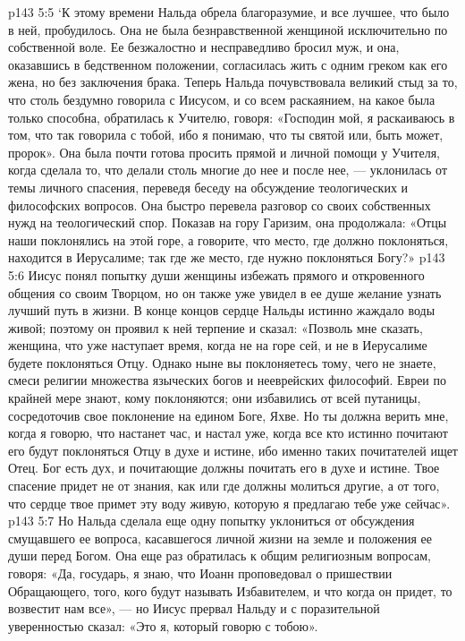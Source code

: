 \vs p143 5:5 `К этому времени Нальда обрела благоразумие, и все лучшее, что было в ней, пробудилось. Она не была безнравственной женщиной исключительно по собственной воле. Ее безжалостно и несправедливо бросил муж, и она, оказавшись в бедственном положении, согласилась жить с одним греком как его жена, но без заключения брака. Теперь Нальда почувствовала великий стыд за то, что столь бездумно говорила с Иисусом, и со всем раскаянием, на какое была только способна, обратилась к Учителю, говоря: «Господин мой, я раскаиваюсь в том, что так говорила с тобой, ибо я понимаю, что ты святой или, быть может, пророк». Она была почти готова просить прямой и личной помощи у Учителя, когда сделала то, что делали столь многие до нее и после нее, --- уклонилась от темы личного спасения, переведя беседу на обсуждение теологических и философских вопросов. Она быстро перевела разговор со своих собственных нужд на теологический спор. Показав на гору Гаризим, она продолжала: «Отцы наши поклонялись на этой горе, а  говорите, что место, где должно поклоняться, находится в Иерусалиме; так где же место, где нужно поклоняться Богу?»
\vs p143 5:6 Иисус понял попытку души женщины избежать прямого и откровенного общения со своим Творцом, но он также уже увидел в ее душе желание узнать лучший путь в жизни. В конце концов сердце Нальды истинно жаждало воды живой; поэтому он проявил к ней терпение и сказал: «Позволь мне сказать, женщина, что уже наступает время, когда не на горе сей, и не в Иерусалиме будете поклоняться Отцу. Однако ныне вы поклоняетесь тому, чего не знаете, смеси религии множества языческих богов и нееврейских философий. Евреи по крайней мере знают, кому поклоняются; они избавились от всей путаницы, сосредоточив свое поклонение на едином Боге, Яхве. Но ты должна верить мне, когда я говорю, что настанет час, и настал уже, когда все кто истинно почитают его будут поклоняться Отцу в духе и истине, ибо именно таких почитателей ищет Отец. Бог есть дух, и почитающие должны почитать его в духе и истине. Твое спасение придет не от знания, как или где должны молиться другие, а от того, что сердце твое примет эту воду живую, которую я предлагаю тебе уже сейчас».
\vs p143 5:7 Но Нальда сделала еще одну попытку уклониться от обсуждения смущавшего ее вопроса, касавшегося личной жизни на земле и положения ее души перед Богом. Она еще раз обратилась к общим религиозным вопросам, говоря: «Да, государь, я знаю, что Иоанн проповедовал о пришествии Обращающего, того, кого будут называть Избавителем, и что когда он придет, то возвестит нам все», --- но Иисус прервал Нальду и с поразительной уверенностью сказал: «Это я, который говорю с тобою».
